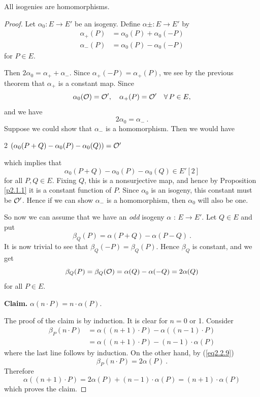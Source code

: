 \begin{theo}
\label{t2.2.2}
All isogenies are homomorphisms.
\end{theo}
\begin{proof}
Let $\alpha_{0}:E\rightarrow E'$ be an isogeny. Define $\alpha\pm:E\rightarrow E'$ by
\begin{align*}
\alpha_{+}(P)&=\alpha_{0}(P)+\alpha_{0}(-P)\\
\alpha_{-}(P)&=\alpha_{0}(P)-\alpha_{0}(-P)
\end{align*}
for $P\in E$.

Then $2\alpha_{0}=\alpha_{+}+\alpha_{-}$. Since $\alpha_{+}(-P)=\alpha_{+}(P)$, we see by the previous theorem that $\alpha_{+}$ is a constant map. Since
$$
\alpha_{0}(\mathcal{O})=\mathcal{O}',\quad \alpha_{+}(P)=\mathcal{O}' \quad \forall\, P\in E,
$$
and we have
$$
2\alpha_{0}=\alpha_{-}\ .
$$
Suppose we could show that $\alpha_{-}$ is a homomorphism. Then we would have
\begin{center}
2 $(\alpha_{0}(P+Q)-\alpha_{0}(P)-\alpha_{0}(Q))=\mathcal{O}'$
\end{center}
which implies that
$$
\alpha_{0}(P+Q)-\alpha_{0}(P)-\alpha_{0}(Q)\in E'[2]
$$
for all $P,Q\in E$. Fixing $Q$, this is a nonsurjective map, and hence by Proposition \ref{p2.1.1} it is a constant function of $P$. Since $\alpha_{0}$ is an isogeny, this constant must be $\mathcal{O}'$. Hence if we can show $\alpha_{-}$ is a homomorphism, then $\alpha_{0}$ will also be one.

So now we can assume that we have an {\it odd} isogeny $\alpha$ : $E\rightarrow E'$. Let $Q\in E$ and put
$$
\beta_{Q}(P)=\alpha(P+Q)-\alpha(P-Q)\ .
$$
It is now trivial to see that $\beta_{Q}(-P)=\beta_{Q}(P)$. Hence $\beta_{Q}$ is constant, and we get
\begin{equation}
\label{eq2.2.9}
\beta_{Q}(P)=\beta_{Q}(\mathcal{O})=\alpha(Q)-\alpha(-Q)=2\alpha(Q)
\end{equation}
for all $P\in E$.

\textbf{Claim.} $\alpha(n\cdot P)=n\cdot\alpha(P)$.

The proof of the claim is by induction. It is clear for $n=0$ or 1. Consider
\begin{align*}
\beta_{P}(n\cdot P)&=\alpha((n+1)\cdot P)-\alpha((n-1)\cdot P)\\
&=\alpha((n+1)\cdot P)-(n-1)\cdot\alpha(P)
\end{align*}
where the last line follows by induction. On the other hand, by (\ref{eq2.2.9})
$$
\beta_{P}(n\cdot P)=2\alpha(P)\ .
$$
Therefore
$$
\alpha((n+1)\cdot P)=2\alpha(P)+(n-1)\cdot\alpha(P)=(n+1)\cdot\alpha(P)
$$
which proves the claim.


\end{proof}
